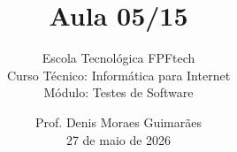 
\title{Aula 05/15}

\subtitle{
\vspace{1.0cm}
Escola Tecnológica FPFtech\\
\vspace{0.5cm}
Curso Técnico: Informática para Internet\\
\vspace{0.5cm}
Módulo: Testes de Software
\vspace{1.0cm}
}

\author{
Prof. Denis Moraes Guimarães\\
\small 27 de maio de 2026
}

\date{}